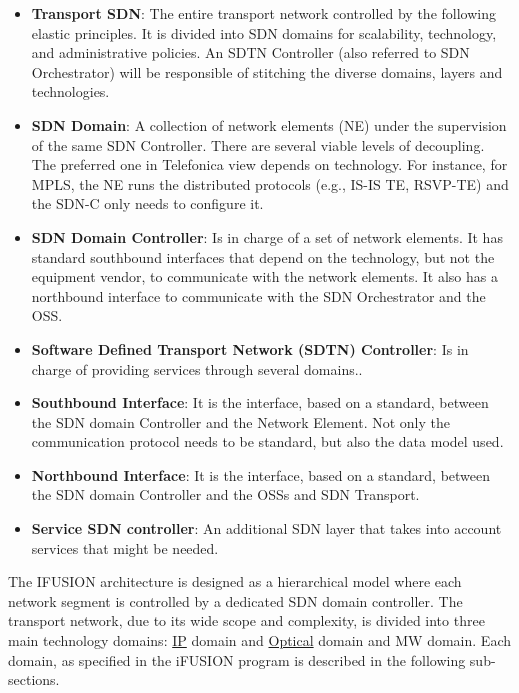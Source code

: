 \documentclass[a4paper,fleqn]{cas-dc}
\begin{document}
\begin{itemize}
\item \textbf{Transport SDN}: The entire transport network controlled by the following elastic principles. It is divided into SDN domains for scalability, technology, and administrative policies. An SDTN Controller (also referred to SDN Orchestrator) will be responsible of stitching the diverse domains, layers and technologies.

\item \textbf{SDN Domain}: A collection of network elements (NE) under the supervision of the same SDN Controller. There are several viable levels of decoupling. The preferred one in Telefonica view depends on technology. For instance, for MPLS, the NE runs the distributed protocols (e.g., IS-IS TE, RSVP-TE) and the SDN-C only needs to configure it.

\item \textbf{SDN Domain Controller}: Is in charge of a set of network elements. It has standard southbound interfaces that depend on the technology, but not the equipment vendor, to communicate with the network elements. It also has a northbound interface to communicate with the SDN Orchestrator and the OSS.

\item \textbf{Software Defined Transport Network (SDTN) Controller}: Is in charge of providing services through several domains.. 

\item \textbf{Southbound Interface}: It is the interface, based on a standard, between the SDN domain Controller and the Network Element. Not only the communication protocol needs to be standard, but also the data model used.

\item \textbf{Northbound Interface}: It is the interface, based on a standard, between the SDN domain Controller and the OSSs and SDN Transport.

\item \textbf{Service SDN controller}: An additional SDN layer that takes into account services that might be needed. 
\end{itemize}

The \uppercase{iFUSION} architecture is designed as a hierarchical model where each network segment is controlled by a dedicated SDN domain controller. The transport network, due to its wide scope and complexity, is divided into three main technology domains: \hyperref[section:ip]{IP} domain and \hyperref[section:dwdm]{Optical} domain and MW domain. Each domain, as specified in the i\uppercase{FUSION} program is described in the following sub-sections.   
\end{document}
